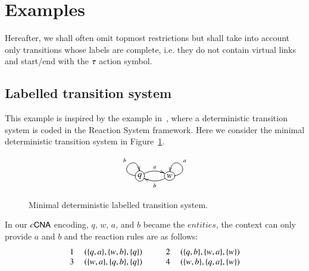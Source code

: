 \section{Examples}
\label{ex:examples}

Hereafter, we shall often omit topmost restrictions but shall take into account only transitions whose labels are complete, i.e. they do not contain 
virtual links and start/end with the $\tau$ action symbol.



\subsection{Labelled transition system}
This example is inspired by the example in~\cite{BEMR11}, where
a deterministic transition system is coded in the Reaction System
framework.
Here we consider the minimal deterministic transition system in Figure~\ref{fig:lts}.
\begin{figure}
\[
\xymatrix{
*+[o][F-]{q} \ar@/ ^/[r]^a \ar@(l,u)[]^b &
*+[o][F-]{w} \ar@/^/[l]^b \ar@(r,u)[]_a
}
\]
\caption{Minimal deterministic labelled transition system.}
\label{fig:lts}
\end{figure}
\noindent
In our $c\textsf{CNA}$ encoding, $q$, $w$, $a$, and $b$ became the $entities$, the context can only provide $a$ and $b$ and the reaction rules are as follows:\\
\[
\begin{array}{cl@{\hspace{1cm}} cl}
1 \ &(\{q,a\},\{w,b\},\{q\}) & 2\ &(\{q,b\},\{w,a\},\{w\})\\
3 \  &(\{w,a\},\{q,b\},\{q\}) & 4\ &(\{w,b\},\{q,a\},\{w\})\\ 
\end{array}
\]
